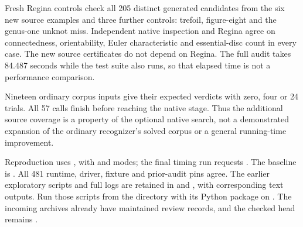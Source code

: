 Fresh Regina controls check all 205 distinct generated candidates from
the six new source examples and three further controls: trefoil,
figure-eight and the genus-one unknot miss. Independent native inspection
and Regina agree on connectedness, orientability, Euler characteristic
and essential-disc count in every case. The new source certificates do
not depend on Regina. The full audit takes 84.487 seconds while the
test suite also runs, so that elapsed time is not a performance comparison.

Nineteen ordinary corpus inputs give their expected verdicts with zero,
four or 24 trials. All 57 calls finish before reaching the native stage.
Thus the additional source coverage is a property of the optional native
search, not a demonstrated expansion of the ordinary recognizer's solved
corpus or a general running-time improvement.



Reproduction uses , with
 and  modes; the final timing run requests
. The baseline is . All 481 runtime,
driver, fixture and prior-audit pins agree. The earlier exploratory scripts
and full logs are retained in  and
, with corresponding text outputs.
Run those scripts from the  directory with its Python package
on . The incoming archives already have maintained review
records, and the checked  head remains .
